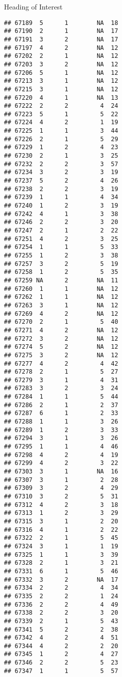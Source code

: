 \documentclass[
  ignorenonframetext,
]{beamer}
\begin{document}
\begin{frame}[fragile]{Heading of Interest}
\begin{verbatim}
## 67189  5      1        NA  18
## 67190  2      1        NA  17
## 67191  3      2        NA  17
## 67197  4      2        NA  12
## 67202  2      1        NA  12
## 67203  3      2        NA  12
## 67206  5      1        NA  12
## 67213  3      1        NA  12
## 67215  3      1        NA  12
## 67220  4      1        NA  13
## 67222  2      2         4  24
## 67223  5      1         5  22
## 67224  4      2         1  19
## 67225  1      1         3  44
## 67226  2      1         5  29
## 67229  1      2         4  23
## 67230  2      1         3  25
## 67232  2      2         3  57
## 67234  3      2         3  19
## 67237  5      2         4  26
## 67238  2      2         3  19
## 67239  1      1         4  34
## 67240  1      2         3  19
## 67242  4      1         3  38
## 67246  2      2         3  20
## 67247  2      1         2  22
## 67251  4      2         3  25
## 67254  1      1         5  33
## 67255  1      2         3  38
## 67257  3      2         5  19
## 67258  1      2         5  35
## 67259 NA      2        NA  11
## 67260  1      1        NA  12
## 67262  1      1        NA  12
## 67263  3      1        NA  12
## 67269  4      2        NA  12
## 67270  2      1         5  40
## 67271  4      2        NA  12
## 67272  3      2        NA  12
## 67274  5      2        NA  12
## 67275  3      2        NA  12
## 67277  4      2         4  42
## 67278  2      1         5  27
## 67279  3      1         4  31
## 67283  3      2         3  24
## 67284  1      1         5  44
## 67286  2      1         2  37
## 67287  6      1         2  33
## 67288  1      1         3  26
## 67289  1      2         3  33
## 67294  3      1         3  26
## 67295  1      1         4  46
## 67298  4      2         4  19
## 67299  4      2         3  22
## 67303  3      1        NA  16
## 67307  3      1         2  28
## 67309  3      2         4  29
## 67310  3      2         5  31
## 67312  4      2         3  18
## 67313  1      2         3  29
## 67315  3      1         2  20
## 67316  4      1         2  22
## 67322  2      1         5  45
## 67324  3      1         1  19
## 67325  1      1         3  39
## 67328  2      1         3  21
## 67331  6      1         5  46
## 67332  3      2        NA  17
## 67334  2      2         4  34
## 67335  2      2         1  24
## 67336  2      2         4  49
## 67338  2      2         3  20
## 67339  2      1         5  43
## 67341  5      2         2  38
## 67342  4      2         4  51
## 67344  4      2         2  20
## 67345  1      2         4  27
## 67346  2      2         5  23
## 67347  1      1         5  57

\end{verbatim}
\end{frame}
\end{document}
